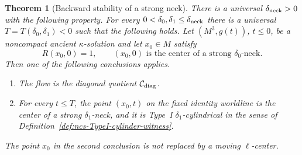 \documentclass[10pt]{coll-l}
\newtheorem{theorem}{Theorem}[chapter]
\theoremstyle{definition}
\theoremstyle{remark}
\numberwithin{section}{chapter}
\numberwithin{equation}{chapter}
\begin{document}
\begin{theorem}[Backward stability of a strong neck]
\label{thm:ncs-backward-neck-stability}
There is a universal $\delta_{\rm neck}>0$ with the following property.  For
every $0<\delta_0,\delta_1\leq\delta_{\rm neck}$ there is a universal
$T=T(\delta_0,\delta_1)<0$ such that the following holds.  Let
$(M^3,g(t))$, $t\leq0$, be a noncompact ancient $\kappa$-solution and let
$x_0\in M$ satisfy
\begin{equation}
             R(x_0,0)=1,\qquad
             (x_0,0)\text{ is the center of a strong }
                         \delta_0\text{-neck}.          \label{eq:ncs-backward-stability-hypotheses}
\end{equation}
Then one of the following conclusions applies.
\begin{enumerate}
\item The flow is the diagonal quotient $\mathcal C_{\rm diag}$.
\item For every $t\leq T$, the point $(x_0,t)$ on the fixed identity
      worldline is the center of a strong $\delta_1$-neck, and it is
      Type~I $\delta_1$-cylindrical in the sense of
      Definition~\ref{def:ncs-TypeI-cylinder-witness}.
\end{enumerate}
The point $x_0$ in the second conclusion is not replaced by a moving
$\ell$-center.
\end{theorem}
\end{document}
